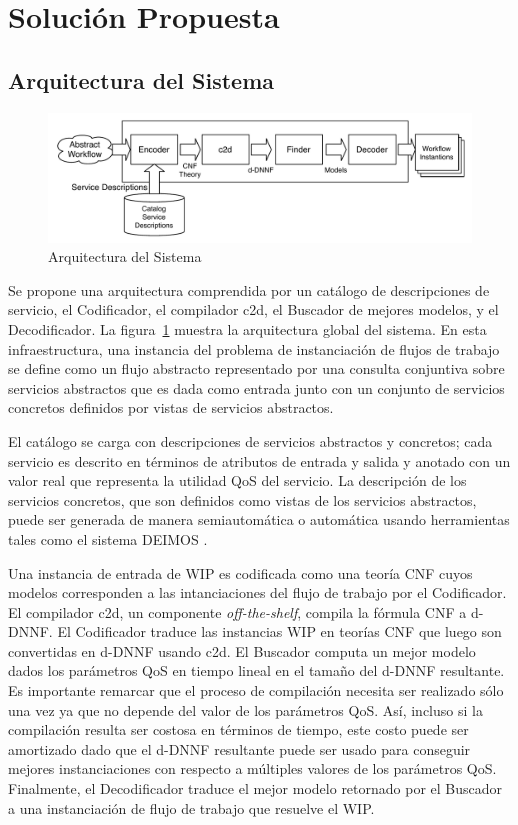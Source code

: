 \section{Solución Propuesta}

\subsection{Arquitectura del Sistema}

\begin{figure}[t]
\centering
\includegraphics[width=.9\textwidth]{graphics/architecture}
\caption{Arquitectura del Sistema}
\label{fig:architecture}
\end{figure}

Se propone una arquitectura comprendida por un catálogo de descripciones de
servicio, el Codificador, el compilador c2d, el Buscador de mejores modelos, y
el Decodificador. La figura~\ref{fig:architecture} muestra la arquitectura global del sistema.
En esta infraestructura, una instancia del problema de instanciación de flujos
de trabajo se define como un flujo abstracto representado por una consulta
conjuntiva sobre servicios abstractos que es dada como entrada junto con un
conjunto de servicios concretos definidos por vistas de servicios abstractos.

El catálogo se carga con descripciones de servicios abstractos y concretos; cada
servicio es descrito en términos de atributos de entrada y salida y anotado con
un valor real que representa la utilidad QoS del servicio. La descripción de los
servicios concretos, que son definidos como vistas de los servicios abstractos,
puede ser generada de manera semiautomática o automática usando herramientas
tales como el sistema DEIMOS \cite{AmbiteISWC09}.

Una instancia de entrada de WIP es codificada como una teoría CNF cuyos modelos
corresponden a las intanciaciones del flujo de trabajo por el Codificador. El
compilador c2d, un componente \emph{off-the-shelf}, compila la fórmula CNF a
d-DNNF. El Codificador traduce las instancias WIP en teorías CNF que luego son
convertidas en d-DNNF usando c2d. El Buscador computa un mejor modelo dados los
parámetros QoS en tiempo lineal en el tamaño del d-DNNF resultante. Es
importante remarcar que el proceso de compilación necesita ser realizado sólo
una vez ya que no depende del valor de los parámetros QoS. Así, incluso si la
compilación resulta ser costosa en términos de tiempo, este costo puede ser
amortizado dado que el d-DNNF resultante puede ser usado para conseguir mejores
instanciaciones con respecto a múltiples valores de los parámetros QoS.
Finalmente, el Decodificador traduce el mejor modelo retornado por el Buscador
a una instanciación de flujo de trabajo que resuelve el WIP.

